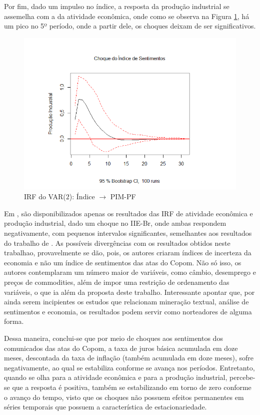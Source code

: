 Por fim, dado um impulso no índice, a resposta da produção industrial se assemelha com a da atividade econômica, onde como se observa na Figura \ref{figure:irf_indice_pimpf_model_2}, há um pico no 5º período, onde a partir dele, os choques deixam de ser significativos.

\pagebreak{}

\begin{figure}[hbtp]
	\centering
	\caption{IRF do VAR($2$): Índice $\rightarrow$ PIM-PF} \label{figure:irf_indice_pimpf_model_2}
	\includegraphics[scale = 0.60]{figuras/irf_indice_pimpf_model_2.PNG}
\end{figure}

Em , são disponibilizados apenas os resultados das IRF de atividade econômica e produção industrial, dado um choque no IIE-Br, onde ambas respondem negativamente, com pequenos intervalos significantes, semelhantes aos resultados do trabalho de . As possíveis divergências com os resultados obtidos neste trabalhao, provavelmente se dão, pois, os autores criaram índices de incerteza da economia e não um índice de sentimentos das atas do Copom. Não só isso, os autores contemplaram um número maior de variáveis, como câmbio, desemprego e preços de commodities, além de impor uma restrição de ordenamento das variáveis, o que ia além da proposta deste trabalho. Interessante apontar que, por ainda serem incipientes os estudos que relacionam mineração textual, análise de sentimentos e economia, os resultados podem servir como norteadores de alguma forma.

Dessa maneira, conclui-se que por meio de choques aos sentimentos dos comunicados das atas do Copom, a taxa de juros básica acumulada em doze meses, descontada da taxa de inflação (também acumulada em doze meses), sofre negativamente, ao qual se estabiliza conforme se avança nos períodos. Entretanto, quando se olha para a atividade econômica e para a produção industrial, percebe-se que a resposta é positiva, também se estabilizando em torno de zero conforme o avanço do tempo, visto que os choques não possuem efeitos permanentes em séries temporais que possuem a característica de estacionariedade. 